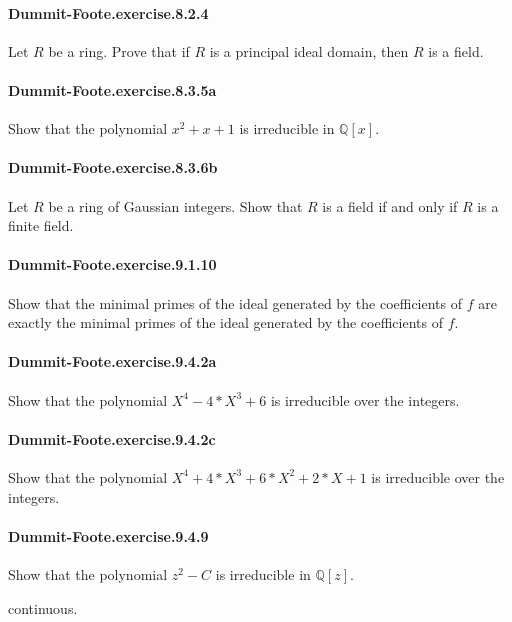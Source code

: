 \documentclass{article}
\begin{document}
\paragraph{Dummit-Foote.exercise.8.2.4} Let $R$ be a ring. Prove that if $R$ is a principal ideal domain, then $R$ is a field.

\paragraph{Dummit-Foote.exercise.8.3.5a} Show that the polynomial $x^2 + x + 1$ is irreducible in $\mathbb{Q}[x]$.

\paragraph{Dummit-Foote.exercise.8.3.6b} Let $R$ be a ring of Gaussian integers. Show that $R$ is a field if and only if $R$ is a finite field.

\paragraph{Dummit-Foote.exercise.9.1.10} Show that the minimal primes of the ideal generated by the coefficients of $f$ are exactly the minimal primes of the ideal generated by the coefficients of $f$.

\paragraph{Dummit-Foote.exercise.9.4.2a} Show that the polynomial $X^4 - 4*X^3 + 6$ is irreducible over the integers.

\paragraph{Dummit-Foote.exercise.9.4.2c} Show that the polynomial $X^4 + 4*X^3 + 6*X^2 + 2*X + 1$ is irreducible over the integers.

\paragraph{Dummit-Foote.exercise.9.4.9} Show that the polynomial $z^2 - C$ is irreducible in $\mathbb{Q}[z]$.

  continuous.
\end{document}

